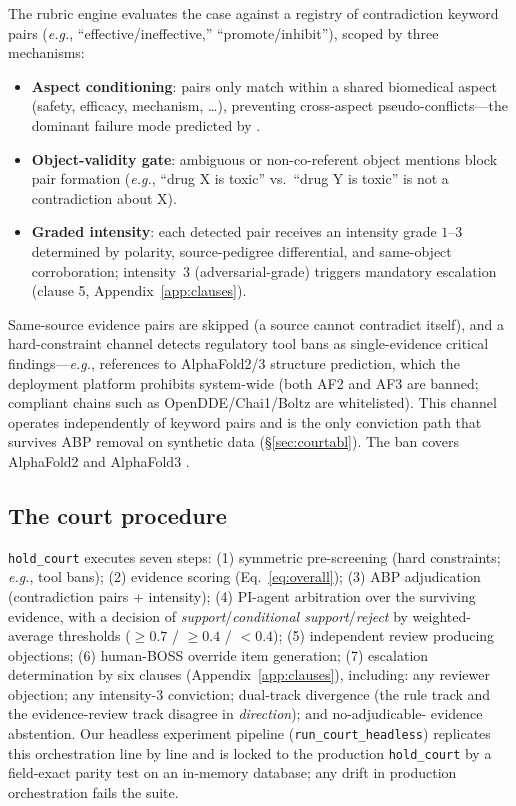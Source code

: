 \documentclass[11pt]{article}
\newcommand{\eg}{\emph{e.g.}}
\begin{document}
The rubric engine evaluates the case against a registry of contradiction
keyword pairs (\eg{}, ``effective/ineffective,'' ``promote/inhibit''),
scoped by three mechanisms:
\begin{itemize}[leftmargin=2em,itemsep=1pt]
\item \textbf{Aspect conditioning}: pairs only match within a shared
biomedical aspect (safety, efficacy, mechanism, \dots{}), preventing
cross-aspect pseudo-conflicts—the dominant failure mode predicted by
\citet{kumar2026when}.
\item \textbf{Object-validity gate}: ambiguous or non-co-referent object
mentions block pair formation (\eg{}, ``drug X is toxic'' vs.\ ``drug Y is
toxic'' is not a contradiction about X).
\item \textbf{Graded intensity}: each detected pair receives an intensity
grade $1$--$3$ determined by polarity, source-pedigree differential, and
same-object corroboration; intensity~$3$ (adversarial-grade) triggers
mandatory escalation (clause 5, Appendix~\ref{app:clauses}).
\end{itemize}
Same-source evidence pairs are skipped (a source cannot contradict itself),
and a hard-constraint channel detects regulatory tool bans as single-evidence
critical findings—\eg{}, references to AlphaFold2/3 structure prediction,
which the deployment platform prohibits system-wide (both AF2 and AF3 are
banned; compliant chains such as OpenDDE/Chai1/Boltz are whitelisted). This
channel operates independently of keyword pairs and is the only
conviction path that survives ABP removal on synthetic data
(\S\ref{sec:courtabl}). The ban covers AlphaFold2 \citep{jumper2021alphafold}
and AlphaFold3 \citep{abramson2024alphafold3}.

\subsection{The court procedure}\label{sec:court}

\texttt{hold\_court} executes seven steps: (1) symmetric pre-screening
(hard constraints; \eg{}, tool bans); (2) evidence scoring
(Eq.~\ref{eq:overall}); (3) ABP adjudication (contradiction pairs +
intensity); (4) PI-agent arbitration over the surviving evidence, with a
decision of \emph{support}/\emph{conditional support}/\emph{reject} by
weighted-average thresholds ($\geq 0.7$ / $\geq 0.4$ / $<0.4$); (5)
independent review producing objections; (6) human-BOSS override item
generation; (7) escalation determination by six clauses
(Appendix~\ref{app:clauses}), including: any reviewer objection; any
intensity-3 conviction; dual-track divergence (the rule track and the
evidence-review track disagree in \emph{direction}); and no-adjudicable-
evidence abstention. Our headless experiment pipeline
(\texttt{run\_court\_headless}) replicates this orchestration line by line
and is locked to the production \texttt{hold\_court} by a field-exact
parity test on an in-memory database; any drift in production orchestration
fails the suite.
\end{document}
